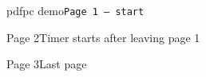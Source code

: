 \documentclass{beamer}
\begin{document}
\begin{frame}{pdfpc demo}\texttt{Page 1 -- start}\end{frame}
\begin{frame}{Page 2}Timer starts after leaving page 1\end{frame}
\begin{frame}{Page 3}Last page\end{frame}
\end{document}

